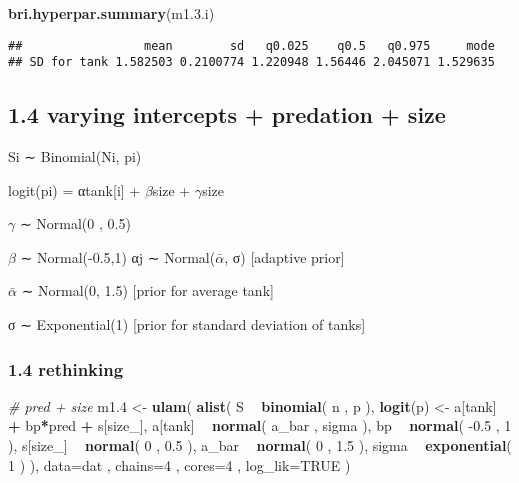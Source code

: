 \documentclass[
]{article}
\newenvironment{Shaded}{\begin{snugshade}}{\end{snugshade}}
\newcommand{\CommentTok}[1]{\textcolor[rgb]{0.56,0.35,0.01}{\textit{#1}}}
\newcommand{\DataTypeTok}[1]{\textcolor[rgb]{0.13,0.29,0.53}{#1}}
\newcommand{\DecValTok}[1]{\textcolor[rgb]{0.00,0.00,0.81}{#1}}
\newcommand{\FloatTok}[1]{\textcolor[rgb]{0.00,0.00,0.81}{#1}}
\newcommand{\KeywordTok}[1]{\textcolor[rgb]{0.13,0.29,0.53}{\textbf{#1}}}
\newcommand{\NormalTok}[1]{#1}
\newcommand{\OperatorTok}[1]{\textcolor[rgb]{0.81,0.36,0.00}{\textbf{#1}}}
\newcommand{\OtherTok}[1]{\textcolor[rgb]{0.56,0.35,0.01}{#1}}
\newcommand{\StringTok}[1]{\textcolor[rgb]{0.31,0.60,0.02}{#1}}
\begin{document}
\begin{Shaded}
\begin{Highlighting}[]
\KeywordTok{bri.hyperpar.summary}\NormalTok{(m1.}\FloatTok{3.}\NormalTok{i)}
\end{Highlighting}
\end{Shaded}

\begin{verbatim}
##                 mean        sd   q0.025    q0.5   q0.975     mode
## SD for tank 1.582503 0.2100774 1.220948 1.56446 2.045071 1.529635
\end{verbatim}

\hypertarget{varying-intercepts-predation-size}{%
\subsection{1.4 varying intercepts + predation +
size}\label{varying-intercepts-predation-size}}

Si ∼ Binomial(Ni, pi)

logit(pi) = αtank{[}i{]} + \(\beta\)size + \(\gamma\)size

\(\gamma\) ∼ Normal(0 , 0.5)

\(\beta\) ∼ Normal(-0.5,1) αj ∼ Normal(\(\bar{\alpha}\), σ) {[}adaptive
prior{]}

\(\bar{\alpha}\) ∼ Normal(0, 1.5) {[}prior for average tank{]}

σ ∼ Exponential(1) {[}prior for standard deviation of tanks{]}

\hypertarget{rethinking-3}{%
\subsubsection{1.4 rethinking}\label{rethinking-3}}

\begin{Shaded}
\begin{Highlighting}[]
\CommentTok{# pred + size }
\NormalTok{m1}\FloatTok{.4}\NormalTok{ <-}\StringTok{ }\KeywordTok{ulam}\NormalTok{(}
\KeywordTok{alist}\NormalTok{(}
\NormalTok{S }\OperatorTok{~}\StringTok{ }\KeywordTok{binomial}\NormalTok{( n , p ),}
\KeywordTok{logit}\NormalTok{(p) <-}\StringTok{ }\NormalTok{a[tank] }\OperatorTok{+}\StringTok{ }\NormalTok{bp}\OperatorTok{*}\NormalTok{pred }\OperatorTok{+}\StringTok{ }\NormalTok{s[size_], }
\NormalTok{a[tank] }\OperatorTok{~}\StringTok{ }\KeywordTok{normal}\NormalTok{( a_bar , sigma ),}
\NormalTok{bp }\OperatorTok{~}\StringTok{ }\KeywordTok{normal}\NormalTok{( }\FloatTok{-0.5}\NormalTok{ , }\DecValTok{1}\NormalTok{ ),}
\NormalTok{s[size_] }\OperatorTok{~}\StringTok{ }\KeywordTok{normal}\NormalTok{( }\DecValTok{0}\NormalTok{ , }\FloatTok{0.5}\NormalTok{ ),}
\NormalTok{a_bar }\OperatorTok{~}\StringTok{ }\KeywordTok{normal}\NormalTok{( }\DecValTok{0}\NormalTok{ , }\FloatTok{1.5}\NormalTok{ ),}
\NormalTok{sigma }\OperatorTok{~}\StringTok{ }\KeywordTok{exponential}\NormalTok{( }\DecValTok{1}\NormalTok{ )}
\NormalTok{), }\DataTypeTok{data=}\NormalTok{dat , }\DataTypeTok{chains=}\DecValTok{4}\NormalTok{ , }\DataTypeTok{cores=}\DecValTok{4}\NormalTok{ , }\DataTypeTok{log_lik=}\OtherTok{TRUE}\NormalTok{ )}
\end{Highlighting}
\end{Shaded}
\end{document}
